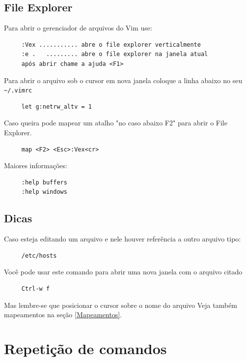 \documentclass[10pt,a4paper,openany]{book}
\begin{document}
\section{File Explorer }
\label{File Explorer }
Para abrir o gerenciador de arquivos do Vim use:

\begin{verbatim}
     :Vex ........... abre o file explorer verticalmente
     :e .   ......... abre o file explorer na janela atual
     após abrir chame a ajuda <F1>
\end{verbatim}

Para abrir o arquivo sob o cursor em nova janela coloque a linha abaixo no seu \verb|~/.vimrc|

\begin{verbatim}
     let g:netrw_altv = 1
\end{verbatim}

Caso queira pode mapear um atalho "no caso abaixo F2" para abrir o File Explorer.

\begin{verbatim}
     map <F2> <Esc>:Vex<cr>
\end{verbatim}

Maiores informações:

\begin{verbatim}
     :help buffers
     :help windows
\end{verbatim}

\section{Dicas}
Caso esteja editando um arquivo e nele houver referência a outro arquivo tipo:

\begin{verbatim}
     /etc/hosts
\end{verbatim}

Você pode usar este comando para abrir uma nova janela com o arquivo citado

\begin{verbatim}
     Ctrl-w f
\end{verbatim}

Mas lembre-se que posicionar o cursor sobre o nome do arquivo
Veja também mapeamentos na seção \ref{Mapeamentos}.

\chapter{Repetição de comandos}\label{Repetição de comandos}
\end{document}
